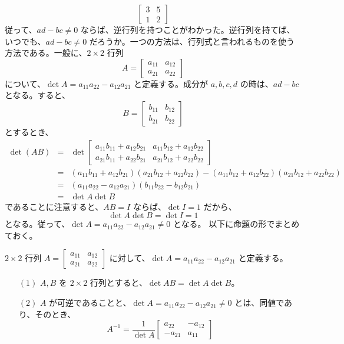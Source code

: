 \begin{eg}
$$\left[\begin{array}{cc}3 & 5\\ 1 & 2 \end{array}\right]$$
従って、$ad-bc \neq 0$ ならば、逆行列を持つことがわかった。逆行列を持てば、いつでも、$ad-bc \neq 0$ だろうか。一つの方法は、行列式と言われるものを使う方法である。一般に、$2\times 2$ 行列
$$A = \left[\begin{array}{cc}a_{11} & a_{12} \\ a_{21} & a_{22} \end{array}\right]$$
について、$\det A = a_{11}a_{22} - a_{12}a_{21}$ と定義する。成分が $a, b, c, d$ の時は、$ad-bc$ となる。すると、
$$B = \left[\begin{array}{cc}b_{11} & b_{12} \\ b_{21} & b_{22} \end{array}\right]$$
とするとき、
\begin{eqnarray*}
\det(AB) &  =  & \det \left[\begin{array}{cc}a_{11}b_{11} + a_{12}b_{21} & a_{11}b_{12}+a_{12}b_{22} \\ a_{21}b_{11}+a_{22}b_{21} & a_{21}b_{12} + a_{22}b_{22} \end{array}\right]\\
& = & (a_{11}b_{11} + a_{12}b_{21})(a_{21}b_{12} + a_{22}b_{22}) - (a_{11}b_{12}+a_{12}b_{22})(a_{21}b_{12} + a_{22}b_{22})\\
& = & (a_{11}a_{22} - a_{12}a_{21})(b_{11}b_{22} - b_{12}b_{21})\\
& = & \det A\det B
\end{eqnarray*}
であることに注意すると、$AB = I$  ならば、$\det I = 1$ だから、
$$\det A\det B = \det I = 1$$
となる。従って、$\det A = a_{11}a_{22} - a_{12}a_{21} \neq 0$ となる。
以下に命題の形でまとめておく。
\end{eg}

\begin{prop} \label{prop:2by2}
$2\times 2$ 行列 ${A = \displaystyle \left[\begin{array}{cc}a_{11} & a_{12} \\ a_{21} & a_{22} \end{array}\right]}$ に対して、$\det A = a_{11}a_{22} - a_{12}a_{21}$ と定義する。
\begin{itemize}
\item[$(1)$] $A,B$ を $2\times 2$ 行列とすると、$\det AB = \det A\det B$。
\item[$(2)$] $A$ が可逆であることと、$\det A = a_{11}a_{22} - a_{12}a_{21} \neq 0$ とは、同値であり、そのとき、
$$A^{-1} = \frac1{\det A}\left[\begin{array}{cc}a_{22} & -a_{12}\\ -a_{21} & a_{11} \end{array}\right]$$
\end{itemize}
\end{prop}


